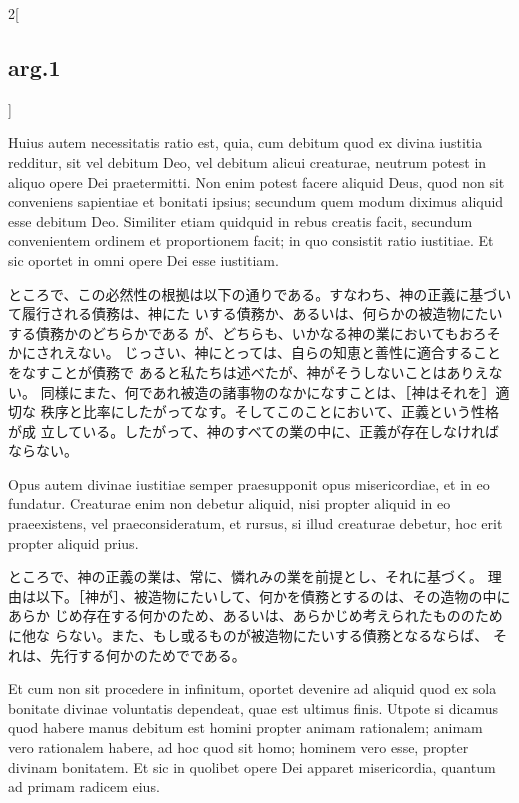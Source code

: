 \documentclass[paper=a4paper,fontsize=10pt,jafontsize=9pt,titlepage]{jlreq}
\begin{document}
\begin{paracol}{2}[\subsection{arg.1}]
\switchcolumn*

Huius autem necessitatis ratio est, quia, cum debitum quod ex
divina iustitia redditur, sit vel debitum Deo, vel debitum alicui
creaturae, neutrum potest in aliquo opere Dei praetermitti. Non enim
potest facere aliquid Deus, quod non sit conveniens sapientiae et
bonitati ipsius; secundum quem modum diximus aliquid esse debitum
Deo. 
Similiter etiam quidquid in rebus creatis facit, secundum
convenientem ordinem et proportionem facit; in quo consistit ratio
iustitiae. Et sic oportet in omni opere Dei esse iustitiam.

\switchcolumn

ところで、この必然性の根拠は以下の通りである。すなわち、神の正義に基づい
 て履行される債務は、神にた
 いする債務か、あるいは、何らかの被造物にたいする債務かのどちらかである
 が、どちらも、いかなる神の業においてもおろそかにされえない。
じっさい、神にとっては、自らの知恵と善性に適合することをなすことが債務で
 あると私たちは述べたが、神がそうしないことはありえない。
同様にまた、何であれ被造の諸事物のなかになすことは、［神はそれを］適切な
 秩序と比率にしたがってなす。そしてこのことにおいて、正義という性格が成
 立している。したがって、神のすべての業の中に、正義が存在しなければならない。

\switchcolumn*

Opus autem
divinae iustitiae semper praesupponit opus misericordiae, et in eo
fundatur. Creaturae enim non debetur aliquid, nisi propter aliquid in eo
praeexistens, vel praeconsideratum, et rursus, si illud creaturae
debetur, hoc erit propter aliquid prius.

\switchcolumn

ところで、神の正義の業は、常に、憐れみの業を前提とし、それに基づく。
理由は以下。［神が］、被造物にたいして、何かを債務とするのは、その造物の中にあらか
 じめ存在する何かのため、あるいは、あらかじめ考えられたもののために他な
 らない。また、もし或るものが被造物にたいする債務となるならば、
 それは、先行する何かのためでである。

\switchcolumn*

Et cum non sit procedere in
infinitum, oportet devenire ad aliquid quod ex sola bonitate divinae
voluntatis dependeat, quae est ultimus finis. Utpote si dicamus quod
habere manus debitum est homini propter animam rationalem; animam vero
rationalem habere, ad hoc quod sit homo; hominem vero esse, propter
divinam bonitatem. Et sic in quolibet opere Dei apparet misericordia,
quantum ad primam radicem eius.

\switchcolumn


\end{paracol}
\end{document}
